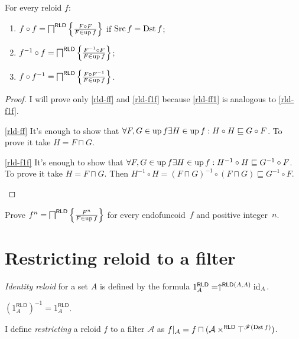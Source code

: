 \begin{thm}
\label{rld-prod-ff}For every reloid $f$:
\begin{enumerate}
\item \label{rld-ff}$f\circ f=\bigsqcap^{\mathsf{RLD}}\left\{ \frac{F\circ F}{F\in\operatorname{up} f}\right\}$
if $\operatorname{Src} f=\operatorname{Dst} f$;
\item \label{rld-f1f}$f^{-1}\circ f=\bigsqcap^{\mathsf{RLD}}\left\{ \frac{F^{-1}\circ F}{F\in\operatorname{up} f}\right\}$;
\item \label{rld-ff1}$f\circ f^{-1}=\bigsqcap^{\mathsf{RLD}}\left\{ \frac{F\circ F^{-1}}{F\in\operatorname{up} f}\right\}$.
\end{enumerate}
\end{thm}
\begin{proof}
I will prove only \ref{rld-ff} and \ref{rld-f1f} because \ref{rld-ff1}
is analogous to \ref{rld-f1f}.
\begin{widedisorder}
\item [{\ref{rld-ff}}] It's enough to show that $\forall F,G\in\operatorname{up} f\exists H\in\operatorname{up} f:H\circ H\sqsubseteq G\circ F$.
To prove it take $H=F\sqcap G$.
\item [{\ref{rld-f1f}}] It's enough to show that $\forall F,G\in\operatorname{up} f\exists H\in\operatorname{up} f:H^{-1}\circ H\sqsubseteq G^{-1}\circ F$.
To prove it take $H=F\sqcap G$. Then $H^{-1}\circ H=(F\sqcap G)^{-1}\circ(F\sqcap G)\sqsubseteq G^{-1}\circ F$.
\end{widedisorder}
\end{proof}
\begin{xca}\label{rld-fn}
Prove $f^n = \bigsqcap^{\mathsf{RLD}}\left\{ \frac{F^n}{F\in\operatorname{up} f}\right\}$ for every endofuncoid~$f$ and positive integer~$n$.
\end{xca}

\section{Restricting reloid to a filter}

\begin{defn}
\emph{Identity reloid} for a set $A$ is defined
by the formula $1_{A}^{\mathsf{RLD}}=\uparrow^{\mathsf{RLD}(A,A)}\operatorname{id}_{A}$.\end{defn}
\begin{obvious}
$(1_{A}^{\mathsf{RLD}})^{-1}=1_{A}^{\mathsf{RLD}}$.\end{obvious}
\begin{defn}
I define \emph{restricting} a reloid $f$
to a filter $\mathcal{A}$ as $f|_{\mathcal{A}}=f\sqcap(\mathcal{A}\times^{\mathsf{RLD}}\top^{\mathscr{F}(\operatorname{Dst} f)})$.
\end{defn}

